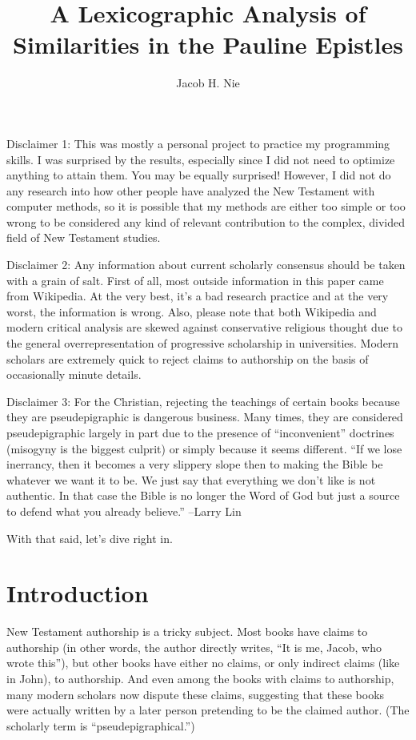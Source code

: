 \documentclass[12pt,letterpaper]{article}
\author{Jacob H. Nie}
\title{A Lexicographic Analysis of Similarities in the Pauline Epistles}
\begin{document}
\maketitle
\tableofcontents

\break


Disclaimer 1: This was mostly a personal project to practice my programming skills.  I was surprised by the results, especially since I did not need to optimize anything to attain them.  You may be equally surprised!  However, I did not do any research into how other people have analyzed the New Testament with computer methods, so it is possible that my methods are either too simple or too wrong to be considered any kind of relevant contribution to the complex, divided field of New Testament studies.  

Disclaimer 2: Any information about current scholarly consensus should be taken with a grain of salt.  First of all, most outside information in this paper came from Wikipedia.  At the very best, it's a bad research practice and at the very worst, the information is wrong.  Also, please note that both Wikipedia and modern critical analysis are skewed against conservative religious thought due to the general overrepresentation of progressive scholarship in universities.  Modern scholars are extremely quick to reject claims to authorship on the basis of occasionally minute details.  

Disclaimer 3: For the Christian, rejecting the teachings of certain books because they are pseudepigraphic is dangerous business.  Many times, they are considered pseudepigraphic largely in part due to the presence of ``inconvenient'' doctrines (misogyny is the biggest culprit) or simply because it seems different.  ``If we lose inerrancy, then it becomes a very slippery slope then to making the Bible be whatever we want it to be.  We just say that everything we don't like is not authentic.  In that case the Bible is no longer the Word of God but just a source to defend what you already believe.'' --Larry Lin

With that said, let's dive right in.  
\section{Introduction}
New Testament authorship is a tricky subject.  Most books have claims to authorship (in other words, the author directly writes, ``It is me, Jacob, who wrote this''), but other books have either no claims, or only indirect claims (like in John), to authorship.  And even among the books with claims to authorship, many modern scholars now dispute these claims, suggesting that these books were actually written by a later person pretending to be the claimed author.  (The scholarly term is ``pseudepigraphical.'')  
\end{document}
